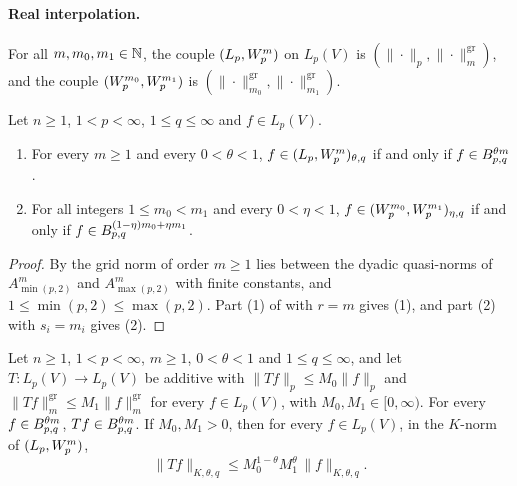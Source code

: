 \paragraph{Real interpolation.}

\begin{definition}
\label{def:sobolev-couples}
\leanok
{}
For all $m, m_0, m_1 \in \mathbb{N}$, the couple $(L_p, W^{m}_{p})$ on $L_p(V)$ is
$(\|\cdot\|_p, \|\cdot\|^{\mathrm{gr}}_{m})$, and the couple $(W^{m_0}_{p}, W^{m_1}_{p})$ is
$(\|\cdot\|^{\mathrm{gr}}_{m_0}, \|\cdot\|^{\mathrm{gr}}_{m_1})$.
\end{definition}

\begin{theorem}
\label{thm:sobolev-interpolate}
\leanok
{}
Let $n \geq 1$, $1 < p < \infty$, $1 \leq q \leq \infty$ and $f \in L_p(V)$.
\begin{enumerate}
  \item For every $m \geq 1$ and every $0 < \theta < 1$,
    $f \in (L_p, W^{m}_{p})_{\theta, q}$ if and only if $f \in B^{\theta m}_{p,q}$.
  \item For all integers $1 \leq m_0 < m_1$ and every $0 < \eta < 1$,
    $f \in (W^{m_0}_{p}, W^{m_1}_{p})_{\eta, q}$ if and only if
    $f \in B^{(1 - \eta) m_0 + \eta m_1}_{p,q}$.
\end{enumerate}
\end{theorem}

\begin{proof}
\leanok
By  the grid norm of order $m \geq 1$ lies between the
dyadic quasi-norms of $A^m_{\min(p,2)}$ and $A^m_{\max(p,2)}$ with finite constants, and
$1 \leq \min(p, 2) \leq \max(p, 2)$. Part (1) of  with
$r = m$ gives (1), and part (2) with $s_i = m_i$ gives (2).
\end{proof}

\begin{corollary}
\label{cor:sobolev-interpolation-operators}
\leanok
{}
Let $n \geq 1$, $1 < p < \infty$, $m \geq 1$, $0 < \theta < 1$ and $1 \leq q \leq \infty$, and
let $T : L_p(V) \to L_p(V)$ be
additive with $\|T f\|_p \leq M_0 \|f\|_p$ and
$\|T f\|^{\mathrm{gr}}_{m} \leq M_1 \|f\|^{\mathrm{gr}}_{m}$ for every $f \in L_p(V)$, with
$M_0, M_1 \in [0, \infty)$. For every $f \in B^{\theta m}_{p,q}$,
$T f \in B^{\theta m}_{p,q}$. If $M_0, M_1 > 0$, then for every $f \in L_p(V)$, in the
$K$-norm of $(L_p, W^{m}_{p})$,
\[
  \|T f\|_{K, \theta, q} \leq M_0^{1 - \theta} M_1^{\theta} \, \|f\|_{K, \theta, q} .
\]
\end{corollary}

